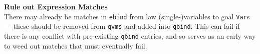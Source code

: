 \textbf{Rule out Expression Matches}\\
 There may already be matches in \texttt{ebind} from law (single-)variables
 to goal \texttt{Var}s --- these should be removed from \texttt{qvms}
 and added into \texttt{qbind}.
 This can fail if there is any conflict with pre-existing
 \texttt{qbind} entries,
 and so serves as an early way to weed out matches that must eventually fail.
